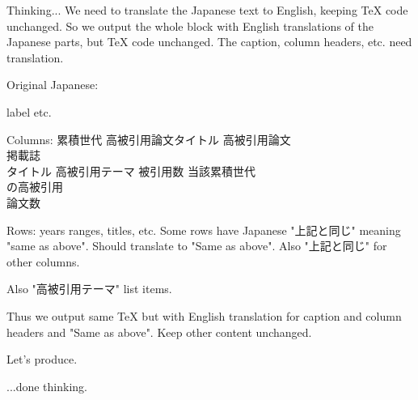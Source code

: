 Thinking...
We need to translate the Japanese text to English, keeping TeX code unchanged. So we output the whole block with English translations of the Japanese parts, but TeX code unchanged. The caption, column headers, etc. need translation.

Original Japanese:

\caption{最多被引用論文タイトル}
label etc.

Columns:
{累積世代}
{高被引用論文タイトル}
{高被引用論文\\掲載誌\\タイトル}
{高被引用テーマ}
{被引用数}
{当該累積世代\\の高被引用\\論文数}

Rows: years ranges, titles, etc. Some rows have Japanese "上記と同じ" meaning "same as above". Should translate to "Same as above". Also "上記と同じ" for other columns.

Also "高被引用テーマ" list items.

Thus we output same TeX but with English translation for caption and column headers and "Same as above". Keep other content unchanged.

Let's produce.

...done thinking.

